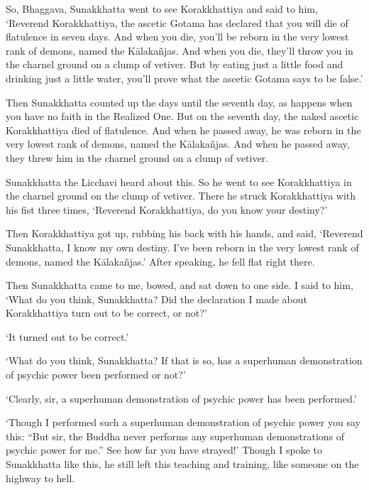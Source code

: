 \documentclass[12pt,openany]{book}%
\begin{document}
So, Bhaggava, Sunakkhatta went to see Korakkhattiya and said to him, ‘Reverend Korakkhattiya, the ascetic Gotama has declared that you will die of flatulence in seven days. And when you die, you’ll be reborn in the very lowest rank of demons, named the \textsanskrit{Kālakañjas}. And when you die, they’ll throw you in the charnel ground on a clump of vetiver. But by eating just a little food and drinking just a little water, you’ll prove what the ascetic Gotama says to be false.’ 

Then Sunakkhatta counted up the days until the seventh day, as happens when you have no faith in the Realized One. But on the seventh day, the naked ascetic Korakkhattiya died of flatulence. And when he passed away, he was reborn in the very lowest rank of demons, named the \textsanskrit{Kālakañjas}. And when he passed away, they threw him in the charnel ground on a clump of vetiver. 

Sunakkhatta the Licchavi heard about this. So he went to see Korakkhattiya in the charnel ground on the clump of vetiver. There he struck Korakkhattiya with his fist three times, ‘Reverend Korakkhattiya, do you know your destiny?’ 

Then Korakkhattiya got up, rubbing his back with his hands, and said, ‘Reverend Sunakkhatta, I know my own destiny. I’ve been reborn in the very lowest rank of demons, named the \textsanskrit{Kālakañjas}.’ After speaking, he fell flat right there. 

Then Sunakkhatta came to me, bowed, and sat down to one side. I said to him, ‘What do you think, Sunakkhatta? Did the declaration I made about Korakkhattiya turn out to be correct, or not?’ 

‘It turned out to be correct.’ 

‘What do you think, Sunakkhatta? If that is so, has a superhuman demonstration of psychic power been performed or not?’ 

‘Clearly, sir, a superhuman demonstration of psychic power has been performed.’ 

‘Though I performed such a superhuman demonstration of psychic power you say this: “But sir, the Buddha never performs any superhuman demonstrations of psychic power for me.” See how far you have strayed!’ Though I spoke to Sunakkhatta like this, he still left this teaching and training, like someone on the highway to hell. 
\end{document}
